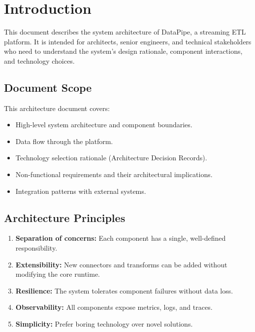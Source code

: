 \documentclass[
    language=english,
    doctype=technical-report,
    institution=none,
    titlestyle=book,
    oneside,
]{../../omnilatex}
\begin{document}
\maketitle

\tableofcontents

\chapter{Introduction}
\label{sec:introduction}

This document describes the system architecture of DataPipe, a streaming
ETL platform. It is intended for architects, senior engineers, and
technical stakeholders who need to understand the system's design
rationale, component interactions, and technology choices.

\section{Document Scope}

This architecture document covers:

\begin{itemize}
    \item High-level system architecture and component boundaries.
    \item Data flow through the platform.
    \item Technology selection rationale (Architecture Decision Records).
    \item Non-functional requirements and their architectural implications.
    \item Integration patterns with external systems.
\end{itemize}

\section{Architecture Principles}

\begin{enumerate}
    \item \textbf{Separation of concerns:} Each component has a single,
        well-defined responsibility.
    \item \textbf{Extensibility:} New connectors and transforms can be
        added without modifying the core runtime.
    \item \textbf{Resilience:} The system tolerates component failures
        without data loss.
    \item \textbf{Observability:} All components expose metrics, logs,
        and traces.
    \item \textbf{Simplicity:} Prefer boring technology over novel
        solutions.
\end{enumerate}
\end{document}
